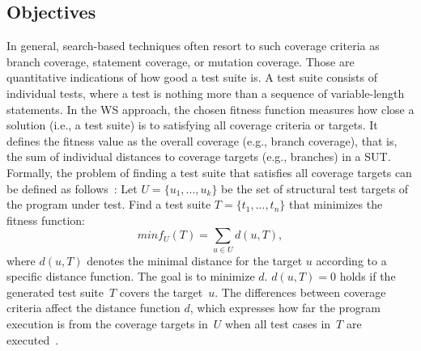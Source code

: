 \documentclass[paper=a4,%
  twoside,%
  BCOR4mm,%
  abstract=true,%
  toc=bibliography,%
  chapterprefix=true,%
  toc=bibliographynumbered,%
  open=right,%
  english,%
  pagesize=pdftex]{scrreprt}
\newcommand{\sut}{\ac{SUT}\xspace}
\begin{document}
\subsection{Objectives}
In general, search-based techniques often resort to such coverage criteria as branch coverage, statement coverage, or mutation coverage. Those are quantitative indications of how good a test suite is. A test suite consists of individual tests, where a test is nothing more than a sequence of variable-length statements. In the \ac{WS} approach, the chosen fitness function measures how close a solution (i.e., a test suite) is to satisfying all coverage criteria or targets. It defines the fitness value as the overall coverage (e.g., branch coverage), that is, the sum of individual distances to coverage targets (e.g., branches) in a \sut. Formally, the problem of finding a test suite that satisfies all coverage targets can be defined as follows~\cite{Panichella2018}: Let $U = \{u_1, ..., u_k\}$ be the set of structural test targets of the program under test. Find a test suite $T = \{t_1, ..., t_n\}$ that minimizes the fitness function:
\begin{equation}
minf_U(T) = \sum_{u \in U}{d(u, T)},
\end{equation}
where $d(u, T)$ denotes the minimal distance for the target $u$ according to a specific distance function. The goal is to minimize $d$. $d(u, T) = 0$ holds if the generated test suite~$T$ covers the target~$u$. The differences between coverage criteria affect the distance function $d$, which expresses how far the program execution is from the coverage targets in~$U$ when all test cases in~$T$ are executed~\cite{Panichella2018}.
\end{document}

